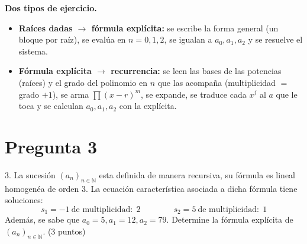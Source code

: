 \documentclass[11pt]{article}
\begin{document}
\medskip
\textbf{Dos tipos de ejercicio.}
\begin{itemize}[leftmargin=1.5em]
\item \textbf{Raíces dadas $\to$ fórmula explícita:} se escribe la forma general (un bloque por raíz), se evalúa en $n=0,1,2$, se igualan a $a_0,a_1,a_2$ y se resuelve el sistema.
\item \textbf{Fórmula explícita $\to$ recurrencia:} se leen las bases de las potencias (raíces) y el grado del polinomio en $n$ que las acompaña (multiplicidad $=$ grado $+1$), se arma $\prod (x-r)^m$, se expande, se traduce cada $x^j$ al $a$ que le toca y se calculan $a_0,a_1,a_2$ con la explícita.
\end{itemize}

\clearpage
\section*{Pregunta 3}

3. La sucesión $(a_n)_{n\in\mathbb N}$ esta definida de manera recursiva, su fórmula es \colorbox{green!35}{lineal homogenéa de orden 3}. La ecuación característica asociada a dicha fórmula tiene soluciones:
\[s_1=-1\ \text{de multiplicidad:}\ \ 2\qquad\qquad s_2=5\ \text{de multiplicidad:}\ \ 1\]
Además, se sabe que $a_0=5,a_1=12,a_2=79$. Determine la \colorbox{green!35}{fórmula explícita} de $(a_n)_{n\in\mathbb N}$. \hfill (3 puntos)

\end{document}
